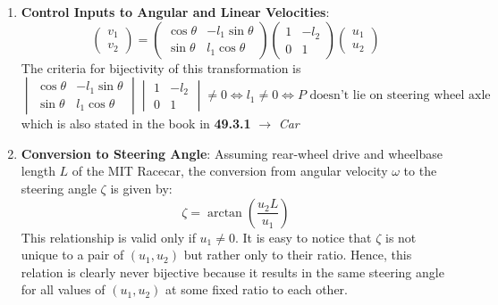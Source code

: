 \documentclass[12pt]{article}
\begin{document}
\begin{enumerate}
    \item \textbf{Control Inputs to Angular and Linear Velocities}:
          \[
              \begin{pmatrix}
                  v_1 \\
                  v_2
              \end{pmatrix}
              =
              \begin{pmatrix}
                  \cos\theta & -l_1 \sin\theta \\
                  \sin\theta & l_1 \cos\theta
              \end{pmatrix}
              \begin{pmatrix}
                  1 & -l_2 \\
                  0 & 1
              \end{pmatrix}
              \begin{pmatrix}
                  u_1 \\ u_2
              \end{pmatrix}
          \]
          The criteria for bijectivity of this transformation is
          \[
              \begin{vmatrix}
                  \cos\theta & -l_1 \sin\theta \\
                  \sin\theta & l_1 \cos\theta
              \end{vmatrix}
              \begin{vmatrix}
                  1 & -l_2 \\
                  0 & 1
              \end{vmatrix} \neq 0 \iff l_1 \neq 0 \iff P\text{ doesn't lie on steering wheel axle}
          \]
          which is also stated in the book in \textbf{49.3.1} \(\to\) \textit{Car}
    \item \textbf{Conversion to Steering Angle}:
          Assuming rear-wheel drive and wheelbase length $L$ of the MIT Racecar, the conversion from angular velocity $\omega$ to the steering angle $\zeta$ is given by:
          \[
              \zeta = \arctan\left(\frac{u_2 L}{u_1}\right)
          \]
          This relationship is valid only if $u_1\neq 0$. It is easy to notice that \(\zeta\) is not unique to a pair of \((u_1,u_2)\) but rather only to their ratio. Hence, this relation is clearly never bijective because it results in the same steering angle for all values of \((u_1,u_2)\) at some fixed ratio to each other.
\end{enumerate}
\end{document}
